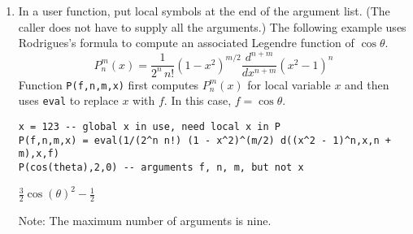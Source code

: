 \begin{enumerate}
\item
In a user function,
put local symbols at the end of the argument list.
(The caller does not have to supply all the arguments.)
The following example uses Rodrigues's formula to
compute an associated Legendre function of $\cos\theta$.
\begin{equation*}
P_n^m(x)=\frac{1}{2^n\,n!}(1-x^2)^{m/2}\frac{d^{n+m}}{dx^{n+m}}(x^2-1)^n
\end{equation*}
Function \verb$P(f,n,m,x)$ first computes $P_n^m(x)$ for local variable
$x$ and then uses \verb$eval$ to replace $x$ with $f$.
In this case, $f=\cos\theta$.

\begin{Verbatim}[formatcom=\color{blue}]
x = 123 -- global x in use, need local x in P
P(f,n,m,x) = eval(1/(2^n n!) (1 - x^2)^(m/2) d((x^2 - 1)^n,x,n + m),x,f)
P(cos(theta),2,0) -- arguments f, n, m, but not x
\end{Verbatim}

\noindent
$\displaystyle \tfrac{3}{2} \cos(\theta)^2-\tfrac{1}{2}$

\bigskip
\noindent
Note: The maximum number of arguments is nine.

\end{enumerate}
